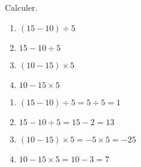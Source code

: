 \begin{exercice}
    Calculer.
    \begin{enumerate}
        \item $(15-10)\div5$
        \item $15-10\div5$
        \item $(10-15)\times 5$
        \item $10-15\times 5$
    \end{enumerate}
\end{exercice}
\begin{corrige}
    \begin{enumerate}
        \item $(15-10)\div5 = 5\div 5 = 1$
        \item $15-10\div5 = 15-2 = 13$
        \item $(10-15)\times 5 =-5\times 5 = -25$
        \item $10-15\times 5 = 10 -3 = 7$
    \end{enumerate}
\end{corrige}